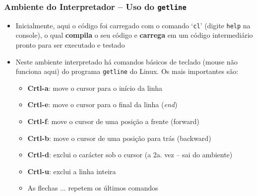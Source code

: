 \begin{frame}[fragile]
\frametitle{Ambiente do Interpretador -- Uso do \texttt{getline}}

\begin{itemize}
  \item Inicialmente, aqui o código foi carregado com o comando `\texttt{cl}' (digite \texttt{help} na console), o qual \textbf{compila} o seu código e \textbf{carrega} em um código intermediário pronto
  para ser executado e testado
  
  \pause
  \item Neste ambiente interpretado há comandos básicos de teclado (mouse não funciona aqui)
  do programa \texttt{getline} do Linux. Os mais importantes são:
  \pause
  \begin{itemize}
    \item  \textbf{Crtl-a}: move o cursor para o início da linha
        \item  \textbf{Crtl-e}: move o cursor para o final da linha (\textit{end})
        \item  \textbf{Crtl-f}: 	move o cursor de uma posição a frente (forward)
         \item  \textbf{Crtl-b}: 	move o cursor de uma posição para trás (backward)
         \item  \textbf{Crtl-d}: 	exclui o carácter sob  o cursor (a 2a. vez -- sai do ambiente)
        \item  \textbf{Crtl-u}: 	exclui a linha inteira
        \item As flechas ... repetem os últimos comandos
  \end{itemize}
  
\end{itemize}

\end{frame}



